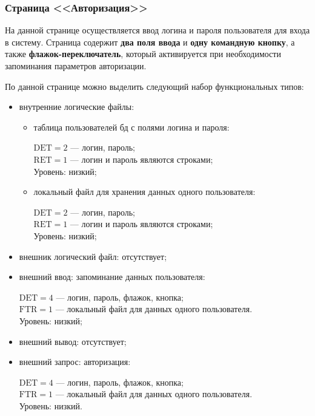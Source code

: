 \subsubsection{Страница <<Авторизация>>}

На данной странице осуществляется ввод логина и пароля пользователя для входа в систему.
Страница содержит \textbf{два поля ввода} и \textbf{одну командную кнопку}, а также \textbf{флажок-переключатель}, который активируется при необходимости запоминания параметров авторизации.

По данной странице можно выделить следующий набор функциональных типов:

\begin{itemize}
    \item внутренние логические файлы:
        \begin{itemize}
            \item таблица пользователей бд с полями логина и пароля:

            $\text{DET} = 2$ --- логин, пароль;\\
            $\text{RET} = 1$ --- логин и пароль являются строками;\\
            Уровень:  низкий;
            
            \item локальный файл для хранения данных одного пользователя:

            $\text{DET} = 2$ --- логин, пароль;\\
            $\text{RET} = 1$ --- логин и пароль являются строками;\\
            Уровень:  низкий;
            
        \end{itemize}
    \item внешник логический файл: отсутствует;
    \item внешний ввод: запоминание данных пользователя:
    
        $\text{DET} = 4$ --- логин, пароль, флажок, кнопка;\\
        $\text{FTR} = 1$ --- локальный файл для данных одного пользователя.\\
        Уровень: низкий;

    \item внешний вывод: отсутствует;
    \item внешний запрос: авторизация:

        $\text{DET} = 4$ --- логин, пароль, флажок, кнопка;\\
        $\text{FTR} = 1$ --- локальный файл для данных одного пользователя.\\
        Уровень: низкий.
\end{itemize}

